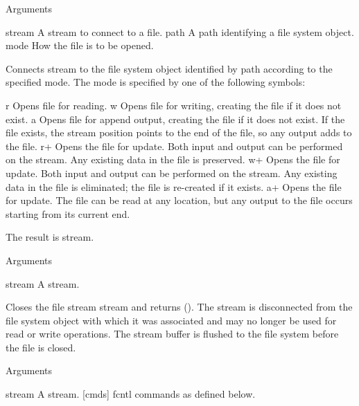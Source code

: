 %
\begin{optPrivate}
%


Arguments

stream
A stream to connect to a file.
path
A path identifying a file system object.
mode
How the file is to be opened.

Connects stream to the file system object identified by path according to the
specified mode. The mode is specified by one of the following symbols:

r
Opens file for reading.
w
Opens file for writing, creating the file if it does not exist.
a
Opens file for append output, creating the file if it does not exist. If
the file exists, the stream position points to the end of the file, so any
output adds to the file.
r+
Opens the file for update. Both input and output can be performed on the
stream. Any existing data in the file is preserved.
w+
Opens the file for update. Both input and output can be performed on the
stream. Any existing data in the file is eliminated; the file is re-created
if it exists.
a+
Opens the file for update. The file can be read at any location, but any
output to the file occurs starting from its current end.

The result is stream.


Arguments

stream
A stream.

Closes the file stream stream and returns (). The stream is disconnected from
the file system object with which it was associated and may no longer be used
for read or write operations. The stream buffer is flushed to the file system
before the file is closed.


Arguments

stream
A stream.
[cmds]
fcntl commands as defined below.


\end{optPrivate}
